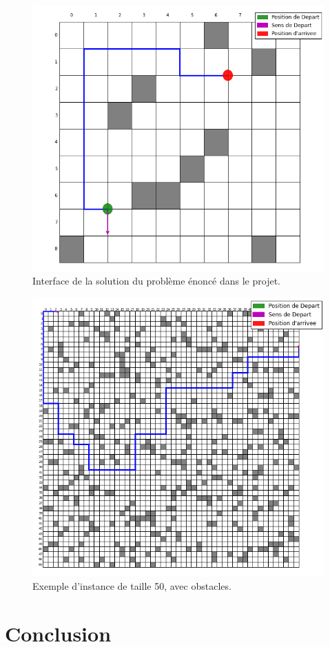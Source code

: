 \documentclass[12pt]{article}
\begin{document}
\begin{figure}[!ht]
\centering
\centerline{\includegraphics[scale=.4]{example1.png}}
\caption{Interface de la solution du problème énoncé dans le projet.}
\label{ex1}
\end{figure}


\begin{figure}[!ht]
\centering
\centerline{\includegraphics[scale=.6]{example2.png}}
\caption{Exemple d'instance de taille 50, avec  obstacles.}
\label{ex2}
\end{figure}

\clearpage
\newpage
\section{Conclusion}





\end{document}
